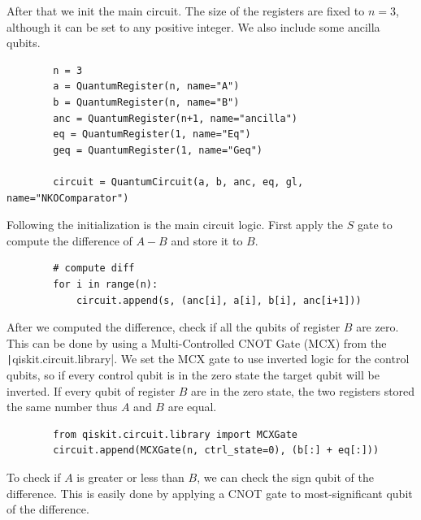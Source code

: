 After that we init the main circuit. The size of the registers are fixed to $n=3$, although it can
be set to any positive integer. We also include some ancilla qubits.

\begin{listing}[ht]
    \centering
    \begin{verbatim}
        n = 3
        a = QuantumRegister(n, name="A")
        b = QuantumRegister(n, name="B")
        anc = QuantumRegister(n+1, name="ancilla")
        eq = QuantumRegister(1, name="Eq")
        geq = QuantumRegister(1, name="Geq")

        circuit = QuantumCircuit(a, b, anc, eq, gl, name="NKOComparator")
    \end{verbatim}
    \caption{}
\end{listing}

\newpage

Following the initialization is the main circuit logic. First apply the $S$ gate to compute
the difference of $A-B$ and store it to $B$.

\begin{listing}[ht]
    \centering
    \begin{verbatim}
        # compute diff
        for i in range(n):
            circuit.append(s, (anc[i], a[i], b[i], anc[i+1]))
    \end{verbatim}
    \caption{}
\end{listing}

After we computed the difference, check if all the qubits of register $B$ are zero.
This can be done by using a Multi-Controlled CNOT Gate (MCX) from the \texttt|qiskit.circuit.library|.
We set the MCX gate to use inverted logic for the control qubits, so if every control qubit is in the zero state
the target qubit will be inverted. If every qubit of register $B$ are in the zero state, the two registers stored
the same number thus $A$ and $B$ are equal.

\begin{listing}[ht]
    \centering
    \begin{verbatim}
        from qiskit.circuit.library import MCXGate
        circuit.append(MCXGate(n, ctrl_state=0), (b[:] + eq[:]))
    \end{verbatim}
    \caption{}
\end{listing}

To check if $A$ is greater or less than $B$, we can check the sign qubit of the difference. This is easily
done by applying a CNOT gate to most-significant qubit of the difference.

